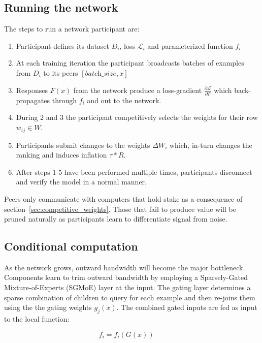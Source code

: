 \documentclass{article}
\begin{document}
\subsection{Running the network}

The steps to run a network participant are:
\begin{enumerate}
	
	\item Participant defines its dataset $D_i$, loss $\mathcal{L}_i$ and parameterized function $f_i$
	\item  At each training iteration the participant broadcasts batches of examples from $D_i$ to its peers $[\textit{batch\_size}, x]$
	\item Responses $F(x)$ from the network produce a loss-gradient $\frac{\partial \mathcal{L}}{\partial F}$ which back-propagates through $f_i$ and out to the network.
	\item  During 2 and 3 the participant competitively selects the weights for their row $w_{ij} \in W$.
	\item  Participants submit changes to the weights $\Delta W_i$ which, in-turn changes the ranking and induces inflation $\tau * R$.
	\item  {\color{blue} After steps 1-5 have been performed multiple times}, participants disconnect and verify the model in a normal manner.
\end{enumerate}

Peers only communicate with computers that hold stake as a consequence of section~\ref{sec:competitive_weights}. Those that fail to produce value will be pruned naturally as participants learn to differentiate signal from noise.

\subsection{Conditional computation}

As the network grows, outward bandwidth will become the major bottleneck. Components learn to trim outward bandwidth by employing a Sparsely-Gated Mixture-of-Experts (SGMoE) \cite{shazeer2017outrageously} layer at the input. The gating layer determines a sparse combination of children to query for each example and then re-joins them using the the gating weights $g_j(x)$. The combined gated inputs are fed as input to the local function: 

\begin{equation}
f_i = f_i(G(x)) \ \ \ \  \textrm{ }
\end{equation}
\end{document}
